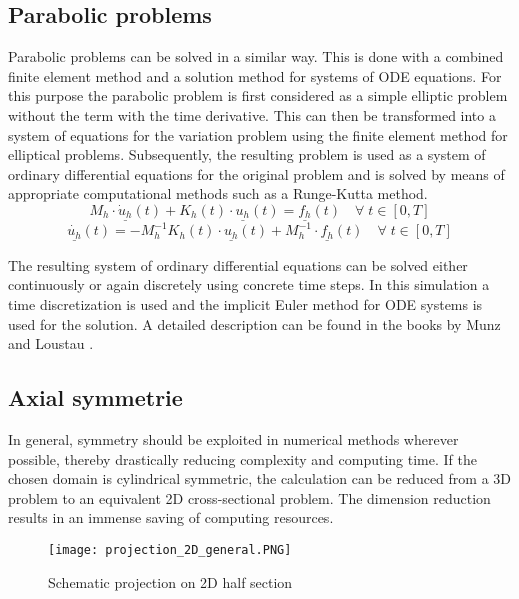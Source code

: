 \documentclass[parskip=half, titlepage=yes, 12pt, BCOR=12mm, DIV=calc]{scrartcl}
\begin{document}
\subsection{Parabolic problems}
Parabolic problems can be solved in a similar way. This is done with a combined finite element method and a solution method for systems of ODE equations. For this purpose the parabolic problem is first considered as a simple elliptic problem without the term with the time derivative. This can then be transformed into a system of equations for the variation problem using the finite element method for elliptical problems. Subsequently, the resulting problem is used as a system of ordinary differential equations for the original problem and is solved by means of appropriate computational methods such as a Runge-Kutta method.
\begin{equation}
     M_h \cdot \underline{\dot{u}_h}(t) + K_h(t) \cdot \underline{u_h}(t) = \underline{f_h}(t) \quad \forall \; t \in [0,T]
\end{equation}
\begin{equation}
    \underline{\dot{u_h}}(t) = -M_h^{-1} K_h(t) \cdot \underline{u_h}(t) + M_h^{-1} \cdot \underline{f_h}(t) \quad \forall \; t \in [0,T]
\end{equation}
    


The resulting system of ordinary differential equations can be solved either continuously or again discretely using concrete time steps. In this simulation a time discretization is used and the implicit Euler method for ODE systems is used for the solution. A detailed description can be found in the books by Munz \cite{munz} and Loustau \cite{loustau}.


\subsection{Axial symmetrie}
In general, symmetry should be exploited in numerical methods wherever possible, thereby drastically reducing complexity and computing time. If the chosen domain is cylindrical symmetric, the calculation can be reduced from a 3D problem to an equivalent 2D cross-sectional problem. The dimension reduction results in an immense saving of computing resources.

\begin{figure}[H]
    \centering
    \texttt{[image: projection\_2D\_general.PNG]}
    \caption{Schematic projection on 2D half section}
    \label{projection_2D_general}
\end{figure}
\end{document}
